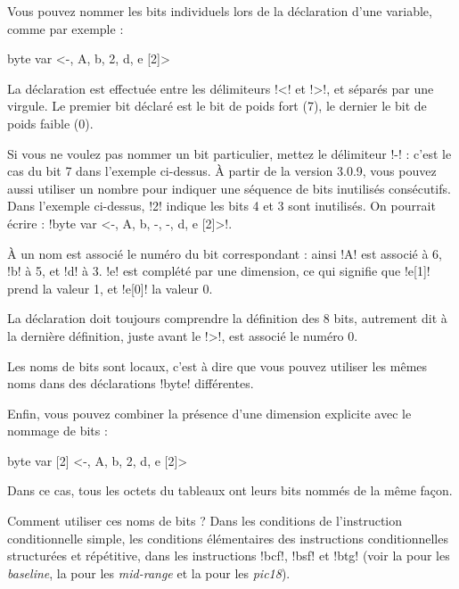 Vous pouvez nommer les bits individuels lors de la déclaration d'une variable, comme par exemple :

\begin{piccolo}
byte var <-, A, b, 2, d, e [2]>
\end{piccolo}

La déclaration est effectuée entre les délimiteurs \pic!<! et \pic!>!, et séparés par une virgule. Le premier bit déclaré est le bit de poids fort (7), le dernier le bit de poids faible (0).

Si vous ne voulez pas nommer un bit particulier, mettez le délimiteur \pic!-! : c'est le cas du bit 7 dans l'exemple ci-dessus. À partir de la version 3.0.9, vous pouvez aussi utiliser un nombre pour indiquer une séquence de bits inutilisés consécutifs. Dans l'exemple ci-dessus, \pic!2! indique les bits 4 et 3 sont inutilisés. On pourrait écrire : \pic!byte var <-, A, b, -, -, d, e [2]>!.


À un nom est associé le numéro du bit correspondant : ainsi \pic!A! est associé à 6, \pic!b! à 5, et \pic!d! à 3. \pic!e! est complété par une dimension, ce qui signifie que \pic!e[1]! prend la valeur 1, et \pic!e[0]! la valeur 0.

La déclaration doit toujours comprendre la définition des 8 bits, autrement dit à la dernière définition, juste avant le \pic!>!, est associé le numéro 0.

Les noms de bits sont locaux, c'est à dire que vous pouvez utiliser les mêmes noms dans des déclarations \pic!byte! différentes.

Enfin, vous pouvez combiner la présence d'une dimension explicite avec le nommage de bits :

\begin{piccolo}
byte var [2] <-, A, b, 2, d, e [2]>
\end{piccolo}

Dans ce cas, tous les octets du tableaux ont leurs bits nommés de la même façon.

Comment utiliser ces noms de bits ? Dans les conditions de l'instruction conditionnelle simple, les conditions élémentaires des instructions conditionnelles structurées et répétitive, dans les instructions \pic!bcf!, \pic!bsf! et \pic!btg! (voir la  pour les \emph{baseline}, la  pour les \emph{mid-range} et la  pour les \emph{pic18}). 



